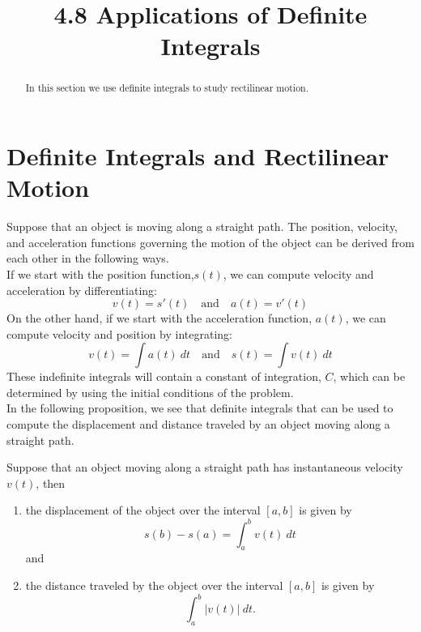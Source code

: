 \documentclass[handout]{ximera}
\title{4.8 Applications of Definite Integrals}
\begin{document}
\begin{abstract}
In this section we use definite integrals to study rectilinear motion.
\end{abstract}

\maketitle



\section{Definite Integrals and Rectilinear Motion}


Suppose that an object is moving along a straight path.
The position, velocity, and acceleration functions governing the motion of the object 
can be derived from each other in the following ways.\\
If we start with the position function,$s(t)$,
we can compute velocity and acceleration by differentiating:
\[v(t) = s'(t)\quad \text{and} \quad a(t) = v'(t)\]
On the other hand, if we start with the acceleration function, $a(t)$,
we can compute velocity and position by integrating:
\[v(t) = \int a(t) \ dt \quad \text{and} \quad s(t) = \int v(t) \ dt\]
These indefinite integrals will contain a constant of integration, $C$, 
which can be determined by using the initial conditions of the problem.\\

In the following proposition, we see that definite integrals that can be used to compute the displacement 
and distance traveled by an object moving along a straight path.\\

\begin{proposition}
Suppose that an object moving along a straight path has instantaneous velocity $v(t)$, then
\begin{enumerate}
\item the displacement of the object over the interval $[a,b]$ is given by 
\[s(b) - s(a) =\int_a^b v(t) \ dt\]
and
\item the distance traveled by the object over the interval $[a,b]$ is given by 
\[\int_a^b |v(t)| \ dt.\]
\end{enumerate}
\end{proposition}
\end{document}
